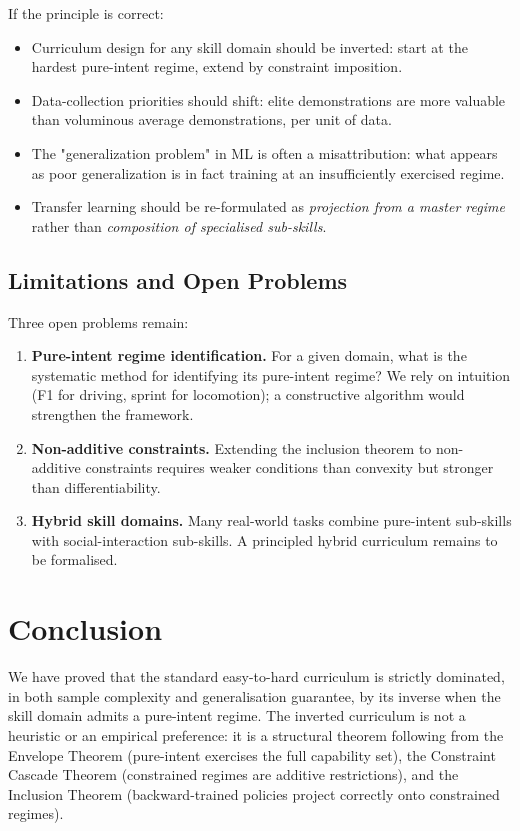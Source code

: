 \documentclass[11pt,twocolumn,a4paper]{article}
\begin{document}
If the principle is correct:

\begin{itemize}[leftmargin=*,itemsep=1pt]
\item Curriculum design for any skill domain should be inverted: start at the hardest pure-intent regime, extend by constraint imposition.
\item Data-collection priorities should shift: elite demonstrations are more valuable than voluminous average demonstrations, per unit of data.
\item The "generalization problem" in ML is often a misattribution: what appears as poor generalization is in fact training at an insufficiently exercised regime.
\item Transfer learning should be re-formulated as \emph{projection from a master regime} rather than \emph{composition of specialised sub-skills}.
\end{itemize}

\subsection{Limitations and Open Problems}

Three open problems remain:

\begin{enumerate}[leftmargin=*,itemsep=1pt]
\item \textbf{Pure-intent regime identification.} For a given domain, what is the systematic method for identifying its pure-intent regime? We rely on intuition (F1 for driving, sprint for locomotion); a constructive algorithm would strengthen the framework.
\item \textbf{Non-additive constraints.} Extending the inclusion theorem to non-additive constraints requires weaker conditions than convexity but stronger than differentiability.
\item \textbf{Hybrid skill domains.} Many real-world tasks combine pure-intent sub-skills with social-interaction sub-skills. A principled hybrid curriculum remains to be formalised.
\end{enumerate}


\section{Conclusion}
\label{sec:conclusion}

We have proved that the standard easy-to-hard curriculum is strictly dominated, in both sample complexity and generalisation guarantee, by its inverse when the skill domain admits a pure-intent regime. The inverted curriculum is not a heuristic or an empirical preference: it is a structural theorem following from the Envelope Theorem (pure-intent exercises the full capability set), the Constraint Cascade Theorem (constrained regimes are additive restrictions), and the Inclusion Theorem (backward-trained policies project correctly onto constrained regimes).
\end{document}
